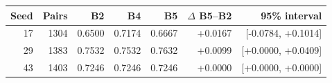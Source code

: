 \begin{tabular}{rrrrrrr}
\toprule
Seed & Pairs & B2 & B4 & B5 & $\Delta$ B5--B2 & 95\% interval \\
\midrule
17 & 1304 & 0.6500 & 0.7174 & 0.6667 & +0.0167 & [-0.0784, +0.1014] \\
29 & 1383 & 0.7532 & 0.7532 & 0.7632 & +0.0099 & [+0.0000, +0.0409] \\
43 & 1403 & 0.7246 & 0.7246 & 0.7246 & +0.0000 & [+0.0000, +0.0000] \\
\bottomrule
\end{tabular}
